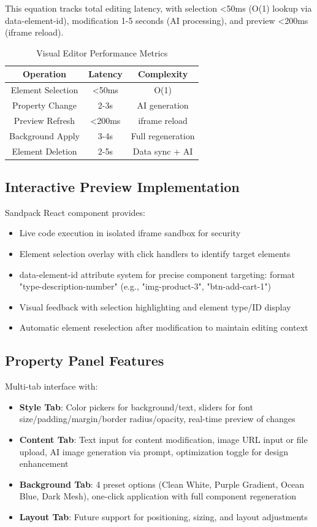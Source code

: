 \documentclass[10pt, conference, letterpaper]{IEEEtran}
\begin{document}
This equation tracks total editing latency, with selection <50ms (O(1) lookup via data-element-id), modification 1-5 seconds (AI processing), and preview <200ms (iframe reload).

\begin{table}[ht]
\centering
\caption{Visual Editor Performance Metrics}
\begin{tabular}{|c|c|c|}
\hline
\textbf{Operation} & \textbf{Latency} & \textbf{Complexity} \\ \hline
Element Selection & <50ms & O(1) \\ \hline
Property Change & 2-3s & AI generation \\ \hline
Preview Refresh & <200ms & iframe reload \\ \hline
Background Apply & 3-4s & Full regeneration \\ \hline
Element Deletion & 2-5s & Data sync + AI \\ \hline
\end{tabular}
\label{tab:editor_metrics}
\end{table}

\subsection{Interactive Preview Implementation}
Sandpack React component provides:
\begin{itemize}
    \item Live code execution in isolated iframe sandbox for security
    \item Element selection overlay with click handlers to identify target elements
    \item data-element-id attribute system for precise component targeting: format "type-description-number" (e.g., "img-product-3", "btn-add-cart-1")
    \item Visual feedback with selection highlighting and element type/ID display
    \item Automatic element reselection after modification to maintain editing context
\end{itemize}

\subsection{Property Panel Features}
Multi-tab interface with:
\begin{itemize}
    \item \textbf{Style Tab}: Color pickers for background/text, sliders for font size/padding/margin/border radius/opacity, real-time preview of changes
    \item \textbf{Content Tab}: Text input for content modification, image URL input or file upload, AI image generation via prompt, optimization toggle for design enhancement
    \item \textbf{Background Tab}: 4 preset options (Clean White, Purple Gradient, Ocean Blue, Dark Mesh), one-click application with full component regeneration
    \item \textbf{Layout Tab}: Future support for positioning, sizing, and layout adjustments
\end{itemize}
\end{document}
